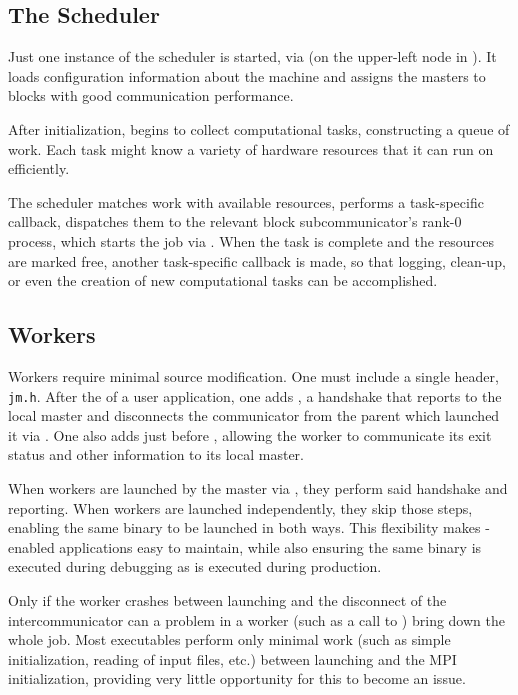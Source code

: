 \subsection{The Scheduler}

Just one instance of the scheduler is started, via \spawn (on the upper-left node in ).
It loads configuration information about the machine and assigns the masters to blocks with good communication performance.

After initialization, \jmscheduler begins to collect computational tasks, constructing a queue of work.
Each task might know a variety of hardware resources that it can run on efficiently.

The scheduler matches work with available resources, performs a task-specific callback, dispatches them to the relevant block subcommunicator's rank-0 process, which starts the job via \spawn.
When the task is complete and the resources are marked free, another task-specific callback is made, so that logging, clean-up, or even the creation of new computational tasks can be accomplished.


\subsection{Workers}

Workers require minimal source modification.
One must include a single header, \texttt{jm.h}.
After the \mpiinit of a user application, one adds \jmhandshake, a handshake that reports to the local master and disconnects the communicator from the parent which launched it via \spawn.
One also adds \jmfinish just before \mpifinalize, allowing the worker to communicate its exit status and other information to its local master.

When workers are launched by the master via \spawn, they perform said handshake and reporting.
When workers are launched independently, they skip those steps, enabling the same binary to be launched in both ways.
This flexibility makes \mpijm-enabled applications easy to maintain, while also ensuring the same binary is executed during debugging as is executed during production.

Only if the worker crashes between launching and the disconnect of the intercommunicator can a problem in a worker (such as a call to \mpiabort) bring down the whole job.
Most executables perform only minimal work (such as simple initialization, reading of input files, etc.) between launching and the MPI initialization, providing very little opportunity for this to become an issue.
 

